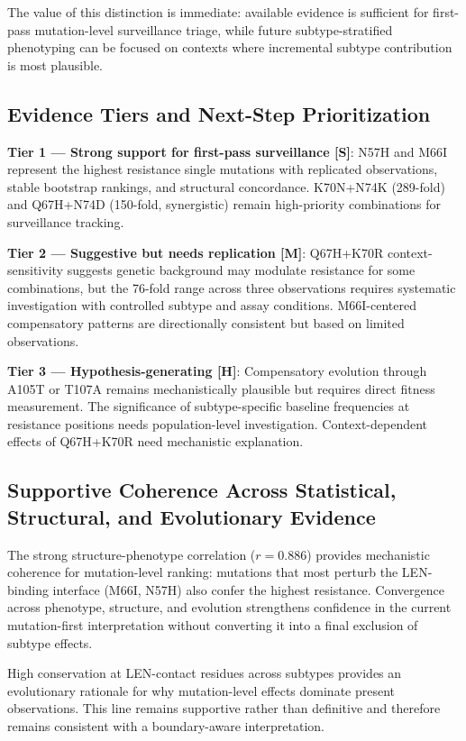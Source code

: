 \documentclass[preprint,authoryear]{elsarticle}
\newcommand{\claimlabel}[1]{\textbf{[#1]}}
\begin{document}
The value of this distinction is immediate: available evidence is sufficient for first-pass mutation-level surveillance triage, while future subtype-stratified phenotyping can be focused on contexts where incremental subtype contribution is most plausible.

\subsection{Evidence Tiers and Next-Step Prioritization}

\textbf{Tier 1 --- Strong support for first-pass surveillance \claimlabel{S}}: N57H and M66I represent the highest resistance single mutations with replicated observations, stable bootstrap rankings, and structural concordance. K70N+N74K (289-fold) and Q67H+N74D (150-fold, synergistic) remain high-priority combinations for surveillance tracking.

\textbf{Tier 2 --- Suggestive but needs replication \claimlabel{M}}: Q67H+K70R context-sensitivity suggests genetic background may modulate resistance for some combinations, but the 76-fold range across three observations requires systematic investigation with controlled subtype and assay conditions. M66I-centered compensatory patterns are directionally consistent but based on limited observations.

\textbf{Tier 3 --- Hypothesis-generating \claimlabel{H}}: Compensatory evolution through A105T or T107A remains mechanistically plausible but requires direct fitness measurement. The significance of subtype-specific baseline frequencies at resistance positions needs population-level investigation. Context-dependent effects of Q67H+K70R need mechanistic explanation.

\subsection{Supportive Coherence Across Statistical, Structural, and Evolutionary Evidence}

The strong structure-phenotype correlation ($r=0.886$) provides mechanistic coherence for mutation-level ranking: mutations that most perturb the LEN-binding interface (M66I, N57H) also confer the highest resistance. Convergence across phenotype, structure, and evolution strengthens confidence in the current mutation-first interpretation without converting it into a final exclusion of subtype effects.

High conservation at LEN-contact residues across subtypes provides an evolutionary rationale for why mutation-level effects dominate present observations. This line remains supportive rather than definitive and therefore remains consistent with a boundary-aware interpretation.
\end{document}
